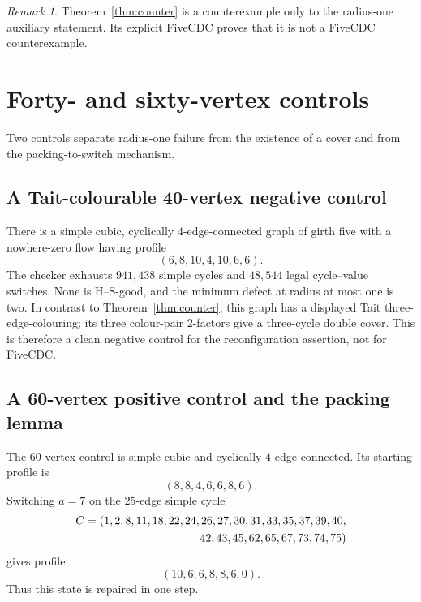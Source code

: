 \documentclass[11pt]{article}
\theoremstyle{definition}
\theoremstyle{remark}
\newtheorem{remark}[theorem]{Remark}
\numberwithin{equation}{section}
\begin{document}
\begin{remark}
Theorem~\ref{thm:counter} is a counterexample only to the radius-one
auxiliary statement.  Its explicit FiveCDC proves that it is not a
FiveCDC counterexample.
\end{remark}

\section{Forty- and sixty-vertex controls}

Two controls separate radius-one failure from the existence of a cover
and from the packing-to-switch mechanism.

\subsection{A Tait-colourable 40-vertex negative control}

There is a simple cubic, cyclically \(4\)-edge-connected graph of girth
five with a nowhere-zero flow having profile
\begin{equation}
                         (6,8,10,4,10,6,6).
\end{equation}
The checker exhausts \(941{,}438\) simple cycles and \(48{,}544\) legal
cycle--value switches.  None is H--S-good, and the minimum defect at
radius at most one is two.  In contrast to
Theorem~\ref{thm:counter}, this graph has a displayed Tait
three-edge-colouring; its three colour-pair \(2\)-factors give a
three-cycle double cover.  This is therefore a clean negative control
for the reconfiguration assertion, not for FiveCDC.

\subsection{A 60-vertex positive control and the packing lemma}

The 60-vertex control is simple cubic and cyclically
\(4\)-edge-connected.  Its starting profile is
\begin{equation}
                         (8,8,4,6,6,8,6).
\label{eq:order60-start-profile}
\end{equation}
Switching \(a=7\) on the \(25\)-edge simple cycle
\begin{equation}
\begin{split}
C=(1,2,8,11,18,22,24,26,27,30,31,33,35,37,39,40,\\
\hspace{31mm}42,43,45,62,65,67,73,74,75)
\end{split}
\label{eq:order60-cycle}
\end{equation}
gives profile
\begin{equation}
                         (10,6,6,8,8,6,0).
\label{eq:order60-end-profile}
\end{equation}
Thus this state is repaired in one step.
\end{document}
